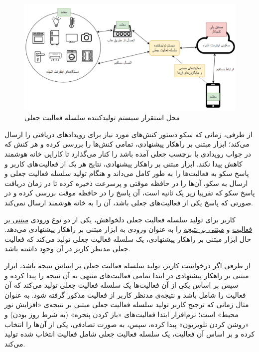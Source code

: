 \begin{figure}[htp]
\centerline{\includegraphics[width=1\textwidth]{figs/fxyz.png}}
\caption{محل استقرار سیستم تولیدکننده سلسله فعالیت جعلی}
\label{fig:fxyz}
\end{figure}

از طرفی، زمانی که سکو دستور کنش‌های مورد نیاز برای رویدادهای دریافتی را ارسال می‌کند؛ ابزار مبتنی بر راهکار پیشنهادی، تمامی کنش‌ها را بررسی کرده و هر کنش که در جواب رویدادی با برچسب جعلی آمده باشد را کنار می‌گذارد تا کارایی خانه هوشمند کاهش پیدا نکند. ابزار مبتنی بر راهکار پیشنهادی، نتایج هر یک از فعالیت‌های کاربر و پاسخ سکو به فعالیت‌ها را به طور کامل می‌داند و هنگام تولید سلسله فعالیت جعلی و ارسال به سکو، آن‌ها را در حافظه موقتی و پرسرعت ذخیره کرده تا در زمان دریافت پاسخ سکو که تقریبا زیر یک ثانیه است، آن پاسخ را در حافظه موقت بررسی کرده و در صورتی که پاسخ یکی از فعالیت‌های جعلی باشد، آن را به خانه‌ هوشمند ارسال نمی‌کند.

کاربر برای تولید سلسله فعالیت جعلی دلخواهش، یکی از دو نوع ورودی \underline{مبتنی بر فعالیت} و \underline{مبتنی بر نتیجه} را به عنوان ورودی به ابزار مبتنی بر راهکار پیشنهادی می‌دهد. حال ابزار مبتنی بر راهکار پیشنهادی، یک سلسله فعالیت جعلی تولید می‌کند که فعالیت جعلی مدنظر کاربر در آن وجود داشته باشد.

از طرفی اگر درخواست کاربر، تولید سلسله فعالیت جعلی بر اساس نتیجه باشد، ابزار مبتنی بر راهکار پیشنهادی در ابتدا تمامی فعالیت‌های منتهی به آن نتیجه را پیدا کرده و سپس بر اساس یکی از آن فعالیت‌ها یک سلسله فعالیت جعلی تولید می‌کند که آن فعالیت را شامل باشد و نتیجه‌ی مدنظر کاربر از فعالیت مذکور گرفته شود. به عنوان مثال زمانی که ترجیح کاربر تولید سلسله فعالیت جعلی مبتنی بر نتیجه‌ی «افزایش نور محیط» است؛ نرم‌افزار ابتدا فعالیت‌های «باز کردن پنجره» (به شرط روز بودن) و «روشن کردن تلویزیون» پیدا کرده، سپس، به صورت تصادفی، یکی از آن‌ها را انتخاب کرده و بر اساس آن فعالیت، یک سلسله فعالیت جعلی شامل فعالیت انتخاب شده تولید می‌کند.

